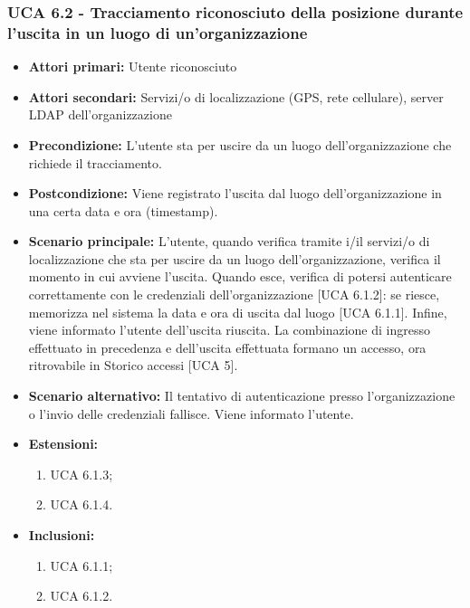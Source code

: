 \subsubsection{UCA 6.2 - Tracciamento riconosciuto della posizione durante l'uscita in un luogo di un'organizzazione}
\begin{itemize}
	\item \textbf{Attori primari:} Utente riconosciuto
	\item \textbf{Attori secondari:} Servizi/o di localizzazione (GPS, rete cellulare), server LDAP dell'organizzazione
	\item \textbf{Precondizione:} L'utente sta per uscire da un luogo dell'organizzazione che richiede il tracciamento.
	\item \textbf{Postcondizione:} Viene registrato l'uscita dal luogo dell'organizzazione in una certa data e ora (timestamp).
	\item \textbf{Scenario principale:} L'utente, quando verifica tramite i/il servizi/o di localizzazione che sta per uscire da un luogo dell'organizzazione, verifica il momento in cui avviene l'uscita. Quando esce, verifica di potersi autenticare correttamente con le credenziali dell'organizzazione [UCA 6.1.2]: se riesce, memorizza nel sistema la data e ora di uscita dal luogo [UCA 6.1.1]. Infine, viene informato l'utente dell'uscita riuscita. La combinazione di ingresso effettuato in precedenza e dell'uscita effettuata formano un accesso, ora ritrovabile in Storico accessi [UCA 5].
	\item \textbf{Scenario alternativo:} Il tentativo di autenticazione presso l'organizzazione o l'invio delle credenziali fallisce. Viene informato l'utente.
	\item \textbf{Estensioni:}
	\begin{enumerate}
		\item UCA 6.1.3;
		\item UCA 6.1.4.
	\end{enumerate}
	\item \textbf{Inclusioni:}
	\begin{enumerate}
		\item UCA 6.1.1;
		\item UCA 6.1.2.
	\end{enumerate}
\end{itemize}

